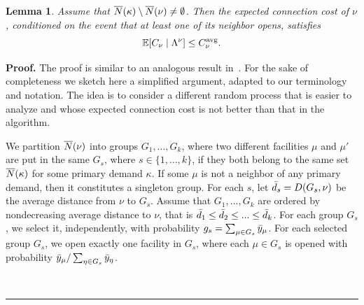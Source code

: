 \documentclass[oneside,final]{ucr}
\newtheorem{lemma}[theorem]{Lemma}
\newenvironment{proof}[1][Proof]{\textbf{#1.} }{\ \rule{0.5em}{0.5em}}
\begin{document}
\begin{lemma}\label{lem: echs expected C_nu}
Assume that ${\overline{N}}(\kappa) \setminus {\overline{N}}(\nu) \neq \emptyset$.
Then the expected connection cost of $\nu$, conditioned on the event that at least one of 
its neighbor opens, satisfies
%
\begin{equation*}
  \mathbb{E}[C_\nu \mid \Lambda^\nu] \leq C^{{\mbox{\scriptsize\rm avg}}}_{\nu}.
\end{equation*}
\end{lemma}
\begin{proof}
The proof is similar to an analogous result in~\cite{ChudakS04,ByrkaA10}. 
For the sake of completeness we sketch here a simplified argument, adapted to our
terminology and notation.
The idea is to consider a different random process that is
easier to analyze and whose expected connection cost is not better than that in
the algorithm.

We partition ${\overline{N}}(\nu)$ into groups $G_1,...,G_k$, where two
different facilities $\mu$ and $\mu'$ are put in the same $G_s$, where
$s\in \{1,\ldots,k\}$, if they both belong to the same set
${\overline{N}}(\kappa)$ for some primary demand $\kappa$. If some $\mu$ is
not a neighbor of any primary demand, then it constitutes a singleton
group.  For each $s$, let ${\bar d}_s = D(G_s,\nu)$ be the average
distance from $\nu$ to $G_s$.  Assume that $G_1,...,G_k$ are ordered
by nondecreasing average distance to $\nu$, that is ${\bar d}_1 \le
{\bar d}_2 \le ... \le {\bar d}_k$.  For each group $G_s$, we select it,
independently, with probability $g_s = \sum_{\mu\in G_s}{\bar y}_{\mu}$.
For each selected group $G_s$,  we
open exactly one facility in $G_s$, where each $\mu\in G_s$
is opened with probability ${\bar y}_{\mu}/\sum_{\eta\in G_s}
{\bar y}_{\eta}$.


\end{proof}
\end{document}

